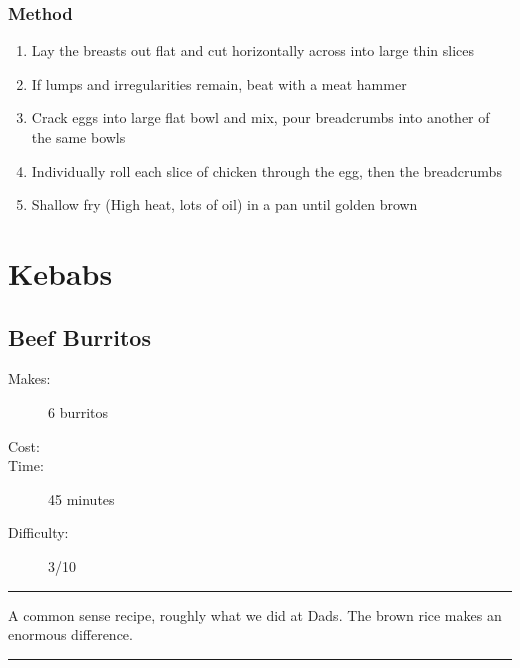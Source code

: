 \documentclass[]{article}
\begin{document}
\subsubsection*{\Large Method}
\begin{enumerate}[font=\huge\color{accent}]
	\item Lay the breasts out flat and cut horizontally across into large thin slices
	\item If lumps and irregularities remain, beat with a meat hammer
	\item Crack eggs into large flat bowl and mix, pour breadcrumbs into another of the same bowls
	\item Individually roll each slice of chicken through the egg, then the breadcrumbs
	\item Shallow fry (High heat, lots of oil) in a pan until golden brown
\end{enumerate}
\newpage
{}
\section*{\center\Huge\color{accent}Kebabs}
\label{cat:Kebabs}
\label{rec:Beef Burritos}
\subsection*{\center\huge Beef Burritos}
\begin{description}
\item[Makes:] 6 burritos
\item[Cost:] \textdollar
\item[Time:] 45 minutes
\item[Difficulty:] 3/10
\end{description}
\vspace{0.2cm}\hrule\vspace{0.5cm}
\begin{adjustwidth}{0.5 cm}{0.5 cm}

A common sense recipe, roughly what we did at Dads. The brown rice makes an enormous difference. \hfill{}\color{black}

\end{adjustwidth}
\vspace{0.5cm}\hrule
\end{document}
